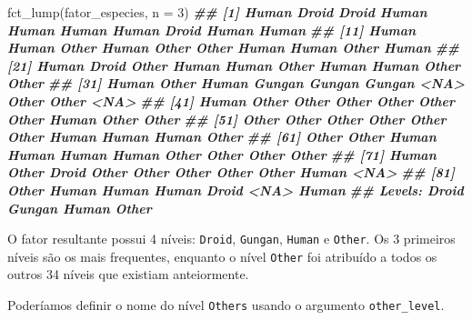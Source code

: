 \documentclass[
]{book}
\newenvironment{Shaded}{\begin{snugshade}}{\end{snugshade}}
\newcommand{\AttributeTok}[1]{\textcolor[rgb]{0.77,0.63,0.00}{#1}}
\newcommand{\DecValTok}[1]{\textcolor[rgb]{0.00,0.00,0.81}{#1}}
\newcommand{\DocumentationTok}[1]{\textcolor[rgb]{0.56,0.35,0.01}{\textbf{\textit{#1}}}}
\newcommand{\FunctionTok}[1]{\textcolor[rgb]{0.00,0.00,0.00}{#1}}
\newcommand{\NormalTok}[1]{#1}
\begin{document}
\begin{Shaded}
\begin{Highlighting}[]
\FunctionTok{fct\_lump}\NormalTok{(fator\_especies, }\AttributeTok{n =} \DecValTok{3}\NormalTok{)}
\DocumentationTok{\#\#  [1] Human  Droid  Droid  Human  Human  Human  Human  Droid  Human  Human }
\DocumentationTok{\#\# [11] Human  Human  Other  Human  Other  Other  Human  Human  Other  Human }
\DocumentationTok{\#\# [21] Human  Droid  Other  Human  Human  Other  Human  Human  Other  Other }
\DocumentationTok{\#\# [31] Human  Other  Human  Gungan Gungan Gungan \textless{}NA\textgreater{}   Other  Other  \textless{}NA\textgreater{}  }
\DocumentationTok{\#\# [41] Human  Other  Other  Other  Other  Other  Other  Human  Other  Other }
\DocumentationTok{\#\# [51] Other  Other  Other  Other  Other  Other  Human  Human  Human  Other }
\DocumentationTok{\#\# [61] Other  Other  Human  Human  Human  Human  Other  Other  Other  Other }
\DocumentationTok{\#\# [71] Human  Other  Droid  Other  Other  Other  Other  Other  Human  \textless{}NA\textgreater{}  }
\DocumentationTok{\#\# [81] Other  Human  Human  Human  Droid  \textless{}NA\textgreater{}   Human }
\DocumentationTok{\#\# Levels: Droid Gungan Human Other}
\end{Highlighting}
\end{Shaded}

O fator resultante possui 4 níveis: \texttt{Droid}, \texttt{Gungan}, \texttt{Human} e \texttt{Other}. Os 3 primeiros níveis são os mais frequentes, enquanto o nível \texttt{Other} foi atribuído a todos os outros 34 níveis que existiam anteiormente.

Poderíamos definir o nome do nível \texttt{Others} usando o argumento \texttt{other\_level}.
\end{document}

